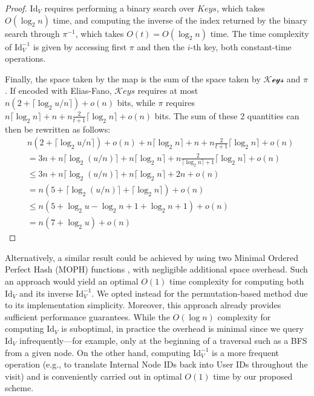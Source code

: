 \begin{proof}
$\mathrm{Id}_V$ requires performing a binary search over $Keys$, which takes $O(\log_2 n)$ time, and computing the inverse of the index returned by the binary search through $\pi^{-1}$, which takes $O(t) = O(\log_2 n)$ time. The time complexity of $\mathrm{Id}_V^{-1}$ is given by accessing first $\pi$ and then the $i$-th key, both constant-time operations.

Finally, the space taken by the map is the sum of the space taken by $\mathcal {Keys}$ and $\pi$.
If encoded with Elias-Fano, $\mathcal Keys$ requires at most $n (2 + \lceil \log_2 u / n \rceil) + o(n)$ bits, while $\pi$ requires $n \lceil \log_2 n \rceil + n + n \frac{2}{t + 1} \lceil \log_2 n \rceil + o(n)$ bits.
The sum of these 2 quantities can then be rewritten as follows: 
\[
\begin{aligned}
    &n (2 + \lceil \log_2 u / n \rceil) + o(n) + n \lceil \log_2 n \rceil + n + n \frac{2}{t + 1} \lceil \log_2 n \rceil + o(n) \\
    &= 3n + n\lceil \log_2 (u / n) \rceil + n \lceil \log_2 n \rceil + n \frac{2}{\lceil \log_2 n \rceil + 1} \lceil \log_2 n \rceil + o(n) \\
    &\le 3n + n\lceil \log_2 (u / n) \rceil + n \lceil \log_2 n \rceil + 2n + o(n) \\
    &= n ( 5 + \lceil \log_2 (u / n) \rceil + \lceil \log_2 n \rceil ) + o(n) \\
    &\le n ( 5 + \log_2 u - \log_2 n + 1 + \log_2 n + 1) + o(n) \\
    &= n (7 + \log_2 u) + o(n)
\end{aligned}
\]

\end{proof}

Alternatively, a similar result could be achieved by using two Minimal Ordered Perfect Hash (MOPH) functions \cite[Section~8.6]{PearlsAE}, with negligible additional space overhead. Such an approach would yield an optimal $O(1)$ time complexity for computing both $\mathrm{Id}_V$ and its inverse $\mathrm{Id}_V^{-1}$. We opted instead for the permutation-based method due to its implementation simplicity. Moreover, this approach already provides sufficient performance guarantees. While the $O(\log n)$ complexity for computing $\mathrm{Id}_V$ is suboptimal, in practice the overhead is minimal since we query $\mathrm{Id}_V$ infrequently—for example, only at the beginning of a traversal such as a BFS from a given node. On the other hand, computing $\mathrm{Id}_V^{-1}$ is a more frequent operation (e.g., to translate Internal Node IDs back into User IDs throughout the visit) and is conveniently carried out in optimal $O(1)$ time by our proposed scheme.


